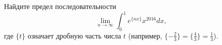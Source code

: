 \documentclass{article}
\begin{document}
Найдите предел последовательности 
$$\lim_{n\to \infty} \int_0^1 e^{\{nx\}} x^{2016} dx,$$
где $\{t\}$ означает дробную часть числа $t$ (например, $\{ -\frac23 \} = \{ \frac43 \} = \frac13$).
\end{document}
